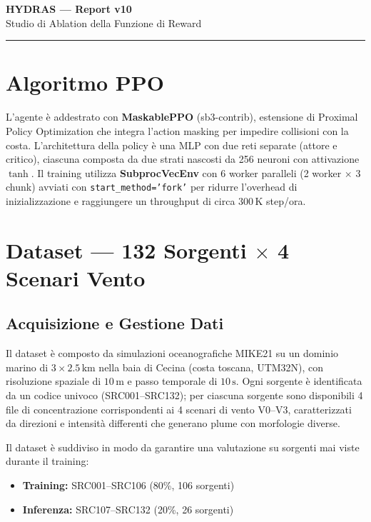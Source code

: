 \documentclass[12pt, a4paper]{article}
\begin{document}
\begin{center}
    {\LARGE\bfseries HYDRAS --- Report v10}\\[6pt]
    {\large Studio di Ablation della Funzione di Reward}
\end{center}
\vspace{0.3cm}
\hrule
\vspace{0.5cm}

\section{Algoritmo PPO}

L'agente \`e addestrato con \textbf{MaskablePPO} (sb3-contrib), estensione di Proximal Policy
Optimization che integra l'action masking per impedire collisioni con la costa.
L'architettura della policy \`e una MLP con due reti separate (attore e critico), ciascuna
composta da due strati nascosti da 256 neuroni con attivazione $\tanh$.
Il training utilizza \textbf{SubprocVecEnv} con 6 worker paralleli (2 worker $\times$ 3 chunk)
avviati con \texttt{start\_method='fork'} per ridurre l'overhead di inizializzazione
e raggiungere un throughput di circa $300\,\text{K}$ step/ora.

\section{Dataset --- 132 Sorgenti $\times$ 4 Scenari Vento}

\subsection{Acquisizione e Gestione Dati}

Il dataset \`e composto da simulazioni oceanografiche MIKE21 su un dominio marino di
$3 \times 2.5\,\text{km}$ nella baia di Cecina (costa toscana, UTM32N), con risoluzione
spaziale di $10\,\text{m}$ e passo temporale di $10\,\text{s}$.
Ogni sorgente \`e identificata da un codice univoco (SRC001--SRC132); per ciascuna sorgente
sono disponibili 4 file di concentrazione corrispondenti ai 4 scenari di vento V0--V3,
caratterizzati da direzioni e intensit\`a differenti che generano plume con morfologie diverse.

Il dataset \`e suddiviso in modo da garantire una valutazione su sorgenti mai viste
durante il training:
\begin{itemize}
    \item \textbf{Training:} SRC001--SRC106 (80\%, 106 sorgenti)
    \item \textbf{Inferenza:} SRC107--SRC132 (20\%, 26 sorgenti)
\end{itemize}
\end{document}
